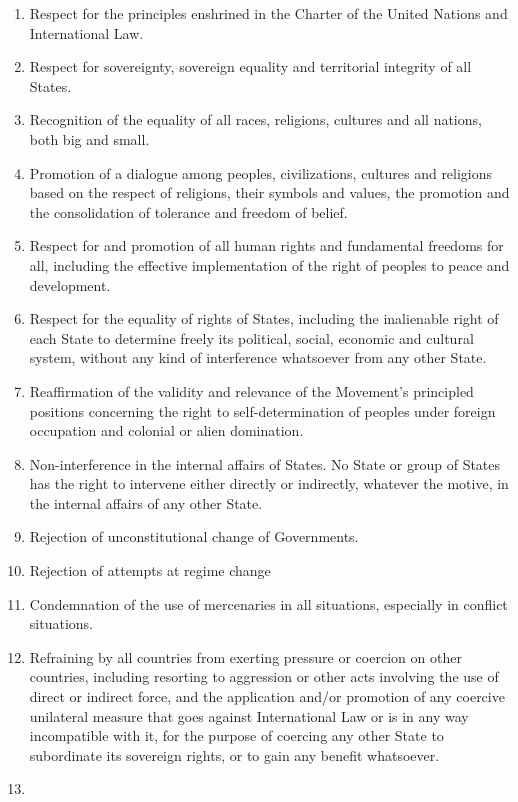 \documentclass[
  openany]{book}
\begin{document}
\begin{enumerate}
\def\labelenumi{\alph{enumi}.}
\item
  Respect for the principles enshrined in the Charter of the United Nations and International Law.
\item
  Respect for sovereignty, sovereign equality and territorial integrity of all States.
\item
  Recognition of the equality of all races, religions, cultures and all nations, both big and small.
\item
  Promotion of a dialogue among peoples, civilizations, cultures and religions based on the respect of religions, their symbols and values, the promotion and the consolidation of tolerance and freedom of belief.
\item
  Respect for and promotion of all human rights and fundamental freedoms for all, including the effective implementation of the right of peoples to peace and development.
\item
  Respect for the equality of rights of States, including the inalienable right of each State to determine freely its political, social, economic and cultural system, without any kind of interference whatsoever from any other State.
\item
  Reaffirmation of the validity and relevance of the Movement's principled positions concerning the right to self-determination of peoples under foreign occupation and colonial or alien domination.
\item
  Non-interference in the internal affairs of States. No State or group of States has the right to intervene either directly or indirectly, whatever the motive, in the internal affairs of any other State.
\item
  Rejection of unconstitutional change of Governments.
\item
  Rejection of attempts at regime change
\item
  Condemnation of the use of mercenaries in all situations, especially in conflict situations.
\item
  Refraining by all countries from exerting pressure or coercion on other countries, including resorting to aggression or other acts involving the use of direct or indirect force, and the application and/or promotion of any coercive unilateral measure that goes against International Law or is in any way incompatible with it, for the purpose of coercing any other State to subordinate its sovereign rights, or to gain any benefit whatsoever.
\item

\end{enumerate}
\end{document}

